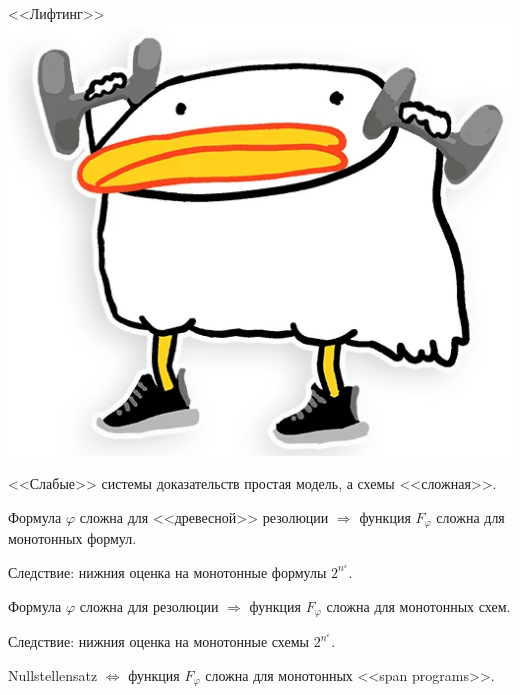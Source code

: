 \begin{frame}{<<Лифтинг>> \includegraphics[scale = 0.04]{pics/utia-lift.png}}

    <<Слабые>> системы доказательств простая модель, а схемы <<сложная>>.
    \pause

    \begin{theorem}
        Формула $\varphi$ сложна для <<древесной>> резолюции $\Rightarrow$ функция $F_{\varphi}$ сложна
        для монотонных формул.
    \end{theorem}

    Следствие: нижния оценка на монотонные формулы $2^{n^{\varepsilon}}$.
    \pause

    \begin{theorem}
        Формула $\varphi$ сложна для резолюции $\Rightarrow$ функция $F_{\varphi}$ сложна
        для монотонных схем.
    \end{theorem}

    Следствие: нижния оценка на монотонные схемы $2^{n^{\varepsilon}}$.
    \pause

    \begin{theorem}
        Nullstellensatz $\Leftrightarrow$ функция $F_{\varphi}$ сложна
        для монотонных <<span programs>>.
    \end{theorem}

\end{frame}


